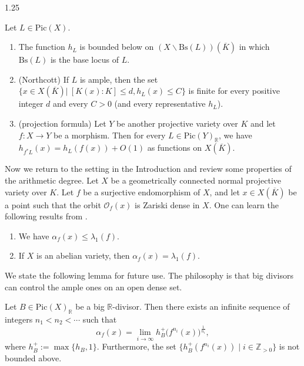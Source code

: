 \documentclass[12pt]{amsart}
\begin{document}
\begin{spacing}{1.25}
\begin{proposition}\label{Prop_ht}
Let $L\in\mathrm{Pic}(X)$.
\begin{enumerate}
\item
The function $h_L$ is bounded below on $(X\backslash\mathrm{Bs}(L))(\overline{K})$ in which $\mathrm{Bs}(L)$ is the base locus of $L$.

\item (Northcott)
If $L$ is ample, then the set $\{x\in X(\overline{K})|\ [K(x):K]\leq d,h_L(x)\leq C\}$ is finite for every positive integer $d$ and every $C>0$ (and every representative $h_L$). 

\item (projection formula)
Let $Y$ be another projective variety over $K$ and let $f:X\rightarrow Y$ be a morphism. Then for every $L\in\mathrm{Pic}(Y)_{\mathbb{R}}$, we have $h_{f^*L}(x)=h_L(f(x))+O(1)$ as functions on $X(\overline{K})$.
\end{enumerate}
\end{proposition}

Now we return to the setting in the Introduction and review some properties of the arithmetic degree. Let $X$ be a geometrically connected normal projective variety over $K$. Let $f$ be a surjective endomorphism of $X$, and let $x\in X(\overline{K})$ be a point such that the orbit $\mathcal{O}_f(x)$ is Zariski dense in $X$. One can learn the following results from \cite{KS16,Sil17,Oh22}.

\begin{proposition}\label{Prop_arithdeg}
\begin{enumerate}
\item
We have $\alpha_f(x)\leq\lambda_1(f)$.
\item
If $X$ is an abelian variety, then $\alpha_f(x)=\lambda_1(f)$.
\end{enumerate}
\end{proposition}

We state the following lemma for future use. The philosophy is that big divisors can control the ample ones on an open dense set.

\begin{lemma}\label{Lem_bight}
Let $B \in\mathrm{Pic}(X)_{\mathbb{R}}$ be a big $\mathbb{R}$-divisor. Then there exists an infinite sequence of integers $n_1 < n_2 < \cdots$ such that
\[
\alpha_f(x) = \lim_{i \to \infty} h_B^+\big(f^{n_i}(x)\big)^{\frac{1}{n_i}},
\]
where $h_B^+ := \max\{h_B, 1\}$. Furthermore, the set $\{h_B^+(f^{n_i}(x)) \mid i \in \mathbb{Z}_{>0} \}$ is not bounded above.
\end{lemma}


\end{spacing}
\end{document}
